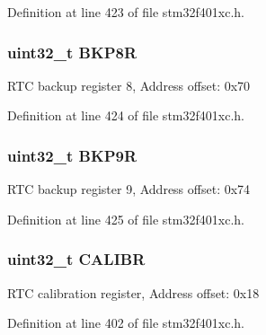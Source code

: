 Definition at line 423 of file stm32f401xc.\+h.

\subsubsection[{\texorpdfstring{B\+K\+P8R}{BKP8R}}]{ uint32\+\_\+t B\+K\+P8R}\hypertarget{struct_r_t_c___type_def_ac1085f6aae54b353c30871fe90c59851}{}\label{struct_r_t_c___type_def_ac1085f6aae54b353c30871fe90c59851}
R\+TC backup register 8, Address offset\+: 0x70 

Definition at line 424 of file stm32f401xc.\+h.

\subsubsection[{\texorpdfstring{B\+K\+P9R}{BKP9R}}]{ uint32\+\_\+t B\+K\+P9R}\hypertarget{struct_r_t_c___type_def_a6c33564df6eaf97400e0457dde9b14ef}{}\label{struct_r_t_c___type_def_a6c33564df6eaf97400e0457dde9b14ef}
R\+TC backup register 9, Address offset\+: 0x74 

Definition at line 425 of file stm32f401xc.\+h.

\subsubsection[{\texorpdfstring{C\+A\+L\+I\+BR}{CALIBR}}]{ uint32\+\_\+t C\+A\+L\+I\+BR}\hypertarget{struct_r_t_c___type_def_ab97f3e9584dda705dc10a5f4c5f6e636}{}\label{struct_r_t_c___type_def_ab97f3e9584dda705dc10a5f4c5f6e636}
R\+TC calibration register, Address offset\+: 0x18 

Definition at line 402 of file stm32f401xc.\+h.

